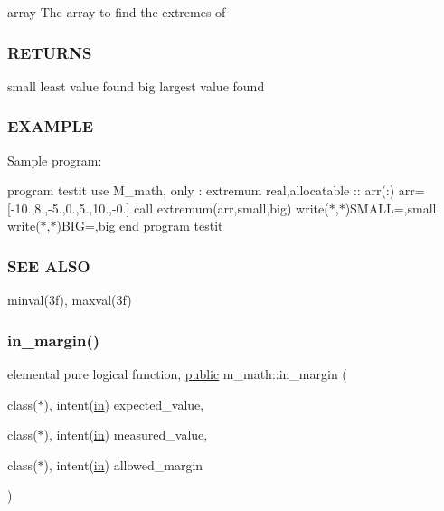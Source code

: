 array The array to find the extremes of

\subsubsection*{R\+E\+T\+U\+R\+NS}

small least value found big largest value found

\subsubsection*{E\+X\+A\+M\+P\+LE}

Sample program\+:

program testit use M\+\_\+math, only \+: extremum real,allocatable \+:\+: arr(\+:) arr=\mbox{[}-\/10.,8.,-\/5.,0.,5.,10.,-\/0.\mbox{]} call extremum(arr,small,big) write($\ast$,$\ast$)\textquotesingle{}S\+M\+A\+LL=\textquotesingle{},small write($\ast$,$\ast$)\textquotesingle{}B\+IG=\textquotesingle{},big end program testit

\subsubsection*{S\+EE A\+L\+SO}

minval(3f), maxval(3f) \mbox{\label{namespacem__math_aa53768584a404262081f26d5d61e1e03}} 
\subsubsection{\texorpdfstring{in\+\_\+margin()}{in\_margin()}}
{\footnotesize\ttfamily elemental pure logical function, \hyperlink{M__stopwatch_83_8txt_a2f74811300c361e53b430611a7d1769f}{public} m\+\_\+math\+::in\+\_\+margin (\begin{DoxyParamCaption}\item[{class($\ast$), intent(\hyperlink{M__journal_83_8txt_afce72651d1eed785a2132bee863b2f38}{in})}]{expected\+\_\+value,  }\item[{class($\ast$), intent(\hyperlink{M__journal_83_8txt_afce72651d1eed785a2132bee863b2f38}{in})}]{measured\+\_\+value,  }\item[{class($\ast$), intent(\hyperlink{M__journal_83_8txt_afce72651d1eed785a2132bee863b2f38}{in})}]{allowed\+\_\+margin }\end{DoxyParamCaption})}



